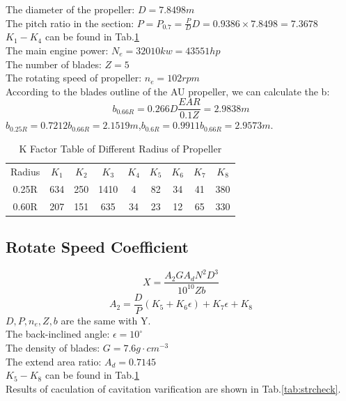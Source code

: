 \documentclass[a4paper,UTF8]{article}
\begin{document}
The diameter of the propeller: $D=7.8498m$\\
The pitch ratio in the section: $P=P_{0.7}=\frac{P}{D}D=0.9386\times7.8498=7.3678$\\
$K_1-K_4$ can be found in Tab.\ref{tab:k}\\
The main engine power: $N_e=32010kw=43551hp$\\
The number of blades: $Z=5$\\
The rotating speed of propeller: $n_e=102rpm$\\
According to the blades outline of the AU propeller, we can calculate the b:
\begin{equation}
	b_{0.66R}=0.266D\frac{EAR}{0.1Z}=2.9838m
\end{equation}
$b_{0.25R}=0.7212b_{0.66R}=2.1519m$,$b_{0.6R}=0.9911b_{0.66R}=2.9573m$.
\begin{table}[htbp]
	\centering
	\begin{tabular}{ccccccccc}
	\hline
	Radius & $K_1$ & $K_2$ &$K_3$  & $K_4$ &$K_5$  & $K_6$ & $K_7$&$K_8$ \\
	0.25R& 634   & 250   & 1410  & 4     & 82    & 34    & 41    & 380 \\
	0.60R& 207   & 151   & 635   & 34    & 23    & 12    & 65    & 330 \\
	\hline
	\end{tabular}
	\caption{K Factor Table of Different Radius of Propeller}
	\label{tab:k}
\end{table}

\subsection{Rotate Speed Coefficient}
\begin{equation}
		X=\frac{A_2GA_dN^2D^3}{10^{10}Zb}
\end{equation}
\begin{equation}
		A_2 = \frac{D}{P}(K_5 + K_6\epsilon) + K_7\epsilon + K_8
\end{equation}
$D,P,n_e,Z,b$ are the same with Y.\\
The back-inclined angle: $\epsilon=10^\circ$\\
The density of blades: $G=7.6g\cdot cm^{-3}$\\
The extend area ratio: $A_d=0.7145$ \\
$K_5-K_8$ can be found in Tab.\ref{tab:k}\\
Results of caculation of cavitation varification are shown in Tab.\ref{tab:strcheck}.
\end{document}
